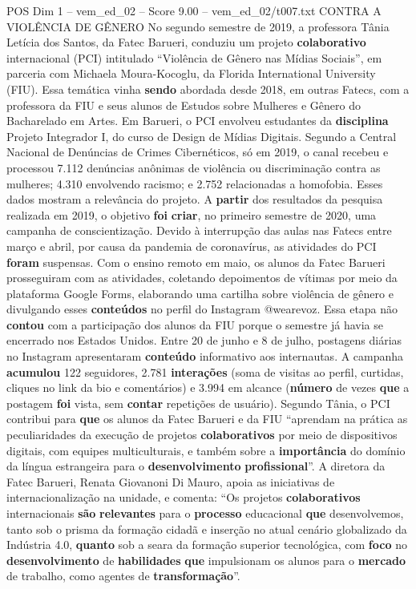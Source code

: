 \begin{textsample}{POS Dim 1 – vem\_ed\_02 – Score 9.00 – vem\_ed\_02/t007.txt}  \label{ex:f1_pos_162}
CONTRA A VIOLÊNCIA DE GÊNERO No segundo semestre de 2019, a professora Tânia Letícia dos Santos, da Fatec Barueri, conduziu um projeto \textbf{colaborativo} internacional (PCI) intitulado “Violência de Gênero nas Mídias Sociais”, em parceria com Michaela Moura-Kocoglu, da Florida International University (FIU).
Essa temática vinha \textbf{sendo} abordada desde 2018, em outras Fatecs, com a professora da FIU e seus alunos de Estudos sobre Mulheres e Gênero do Bacharelado em Artes.
Em Barueri, o PCI envolveu estudantes da \textbf{disciplina} Projeto Integrador I, do curso de Design de Mídias Digitais.
Segundo a Central Nacional de Denúncias de Crimes Cibernéticos, só em 2019, o canal recebeu e processou 7.112 denúncias anônimas de violência ou discriminação contra as mulheres; 4.310 envolvendo racismo; e 2.752 relacionadas a homofobia.
Esses dados mostram a relevância do projeto.
A \textbf{partir} dos resultados da pesquisa realizada em 2019, o objetivo \textbf{foi} \textbf{criar}, no primeiro semestre de 2020, uma campanha de conscientização.
Devido à interrupção das aulas nas Fatecs entre março e abril, por causa da pandemia de coronavírus, as atividades do PCI \textbf{foram} suspensas.
Com o ensino remoto em maio, os alunos da Fatec Barueri prosseguiram com as atividades, coletando depoimentos de vítimas por meio da plataforma Google Forms, elaborando uma cartilha sobre violência de gênero e divulgando esses \textbf{conteúdos} no perfil do Instagram @wearevoz.
Essa etapa não \textbf{contou} com a participação dos alunos da FIU porque o semestre já havia se encerrado nos Estados Unidos.
Entre 20 de junho e 8 de julho, postagens diárias no Instagram apresentaram \textbf{conteúdo} informativo aos internautas.
A campanha \textbf{acumulou} 122 seguidores, 2.781 \textbf{interações} (soma de visitas ao perfil, curtidas, cliques no link da bio e comentários) e 3.994 em alcance (\textbf{número} de vezes \textbf{que} a postagem \textbf{foi} vista, sem \textbf{contar} repetições de usuário).
Segundo Tânia, o PCI contribui para \textbf{que} os alunos da Fatec Barueri e da FIU “aprendam na prática as peculiaridades da execução de projetos \textbf{colaborativos} por meio de dispositivos digitais, com equipes multiculturais, e também sobre a \textbf{importância} do domínio da língua estrangeira para o \textbf{desenvolvimento} \textbf{profissional}”.
A diretora da Fatec Barueri, Renata Giovanoni Di Mauro, apoia as iniciativas de internacionalização na unidade, e comenta: “Os projetos \textbf{colaborativos} internacionais \textbf{são} \textbf{relevantes} para o \textbf{processo} educacional \textbf{que} desenvolvemos, tanto sob o prisma da formação cidadã e inserção no atual cenário globalizado da Indústria 4.0, \textbf{quanto} sob a seara da formação superior tecnológica, com \textbf{foco} no \textbf{desenvolvimento} de \textbf{habilidades} \textbf{que} impulsionam os alunos para o \textbf{mercado} de trabalho, como agentes de \textbf{transformação}”.

\end{textsample}
